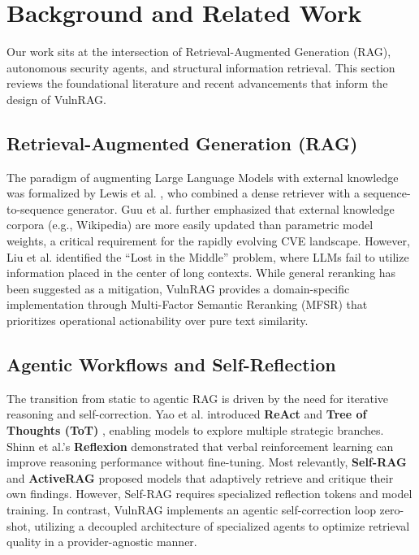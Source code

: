 \section{Background and Related Work}
\label{sec:background}

Our work sits at the intersection of Retrieval-Augmented Generation (RAG), autonomous security agents, and structural information retrieval. This section reviews the foundational literature and recent advancements that inform the design of VulnRAG.

\subsection{Retrieval-Augmented Generation (RAG)}
The paradigm of augmenting Large Language Models with external knowledge was formalized by Lewis et al. \cite{rag}, who combined a dense retriever with a sequence-to-sequence generator. Guu et al. \cite{realm} further emphasized that external knowledge corpora (e.g., Wikipedia) are more easily updated than parametric model weights, a critical requirement for the rapidly evolving CVE landscape. However, Liu et al. \cite{lostmiddle} identified the ``Lost in the Middle'' problem, where LLMs fail to utilize information placed in the center of long contexts. While general reranking has been suggested as a mitigation, VulnRAG provides a domain-specific implementation through Multi-Factor Semantic Reranking (MFSR) that prioritizes operational actionability over pure text similarity.

\subsection{Agentic Workflows and Self-Reflection}
The transition from static to agentic RAG is driven by the need for iterative reasoning and self-correction. Yao et al. introduced \textbf{ReAct} \cite{react} and \textbf{Tree of Thoughts (ToT)} \cite{tot}, enabling models to explore multiple strategic branches. Shinn et al.'s \textbf{Reflexion} \cite{reflexion} demonstrated that verbal reinforcement learning can improve reasoning performance without fine-tuning. Most relevantly, \textbf{Self-RAG} \cite{selfrag} and \textbf{ActiveRAG} \cite{activerag} proposed models that adaptively retrieve and critique their own findings. However, Self-RAG requires specialized reflection tokens and model training. In contrast, VulnRAG implements an agentic self-correction loop zero-shot, utilizing a decoupled architecture of specialized agents to optimize retrieval quality in a provider-agnostic manner.

